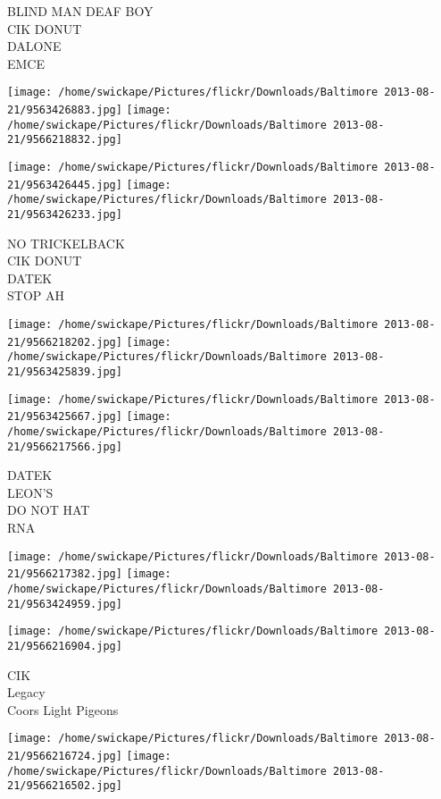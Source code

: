 \documentclass[10pt,letterpaper]{article}
\begin{document}
BLIND MAN DEAF BOY\\
CIK DONUT\\
DALONE\\
EMCE\\
\pagebreak

\texttt{[image: /home/swickape/Pictures/flickr/Downloads/Baltimore 2013-08-21/9563426883.jpg]}
\texttt{[image: /home/swickape/Pictures/flickr/Downloads/Baltimore 2013-08-21/9566218832.jpg]}

\texttt{[image: /home/swickape/Pictures/flickr/Downloads/Baltimore 2013-08-21/9563426445.jpg]}
\texttt{[image: /home/swickape/Pictures/flickr/Downloads/Baltimore 2013-08-21/9563426233.jpg]}

NO TRICKELBACK\\
CIK DONUT\\
DATEK\\
STOP AH\\
\pagebreak

\texttt{[image: /home/swickape/Pictures/flickr/Downloads/Baltimore 2013-08-21/9566218202.jpg]}
\texttt{[image: /home/swickape/Pictures/flickr/Downloads/Baltimore 2013-08-21/9563425839.jpg]}

\texttt{[image: /home/swickape/Pictures/flickr/Downloads/Baltimore 2013-08-21/9563425667.jpg]}
\texttt{[image: /home/swickape/Pictures/flickr/Downloads/Baltimore 2013-08-21/9566217566.jpg]}

DATEK\\
LEON'S\\
DO NOT HAT\\
RNA\\
\pagebreak

\texttt{[image: /home/swickape/Pictures/flickr/Downloads/Baltimore 2013-08-21/9566217382.jpg]}
\texttt{[image: /home/swickape/Pictures/flickr/Downloads/Baltimore 2013-08-21/9563424959.jpg]}

\vspace{0.25in}
\texttt{[image: /home/swickape/Pictures/flickr/Downloads/Baltimore 2013-08-21/9566216904.jpg]}

CIK\\
Legacy\\
Coors Light Pigeons\\
\pagebreak

\texttt{[image: /home/swickape/Pictures/flickr/Downloads/Baltimore 2013-08-21/9566216724.jpg]}
\texttt{[image: /home/swickape/Pictures/flickr/Downloads/Baltimore 2013-08-21/9566216502.jpg]}
\end{document}
